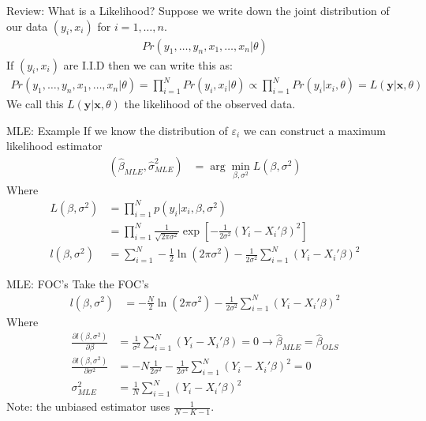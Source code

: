 \documentclass[aspectratio=169]{beamer}
\begin{document}
\begin{frame}{Review: What is a Likelihood?}
Suppose we write down the joint distribution of our data $(y_i,x_i)$ for $i=1,\ldots,n$.
\begin{align*}
Pr(y_1,\ldots,y_n, x_1,\ldots,x_n | \theta)
\end{align*}
If  $(y_i,x_i)$ are I.I.D then we can write this as:
\begin{align*}
 Pr(y_1,\ldots,y_n, x_1,\ldots,x_n | \theta) = \prod_{i=1}^N Pr(y_i, x_i | \theta) \propto \prod_{i=1}^N Pr(y_i | x_i , \theta)=L( \mathbf{y}| \mathbf{x} ,\theta )
\end{align*}
We call this $L( \mathbf{y}| \mathbf{x} ,\theta )$ the \alert{likelihood} of the observed data.
\end{frame}




\begin{frame}{MLE: Example}
If we know the distribution of $\varepsilon_i$ we can construct a \alert{maximum likelihood estimator}
\begin{align*}
(\widehat{\beta}_{MLE},\widehat{\sigma}^2_{MLE}) &= \arg \min_{\beta,\sigma^2} L(\beta,\sigma^2)
\end{align*}
Where 
\begin{align*} 
L(\beta,\sigma^2) &= \prod_{i=1}^N p(y_i | x_i,\beta,\sigma^2) \\
                  &= \prod_{i=1}^N \frac{1}{\sqrt{2 \pi \sigma^2}} \exp \left[-\frac{1}{2\sigma^2}(Y_i - X_i' \beta)^2 \right]\\
l(\beta,\sigma^2) &= \sum_{i=1}^N -\frac{1}{2} \ln (2 \pi \sigma^2) - \frac{1}{2 \sigma^2} \sum_{i=1}^N(Y_i - X_i' \beta)^2
\end{align*}
\end{frame}

\begin{frame}{MLE: FOC's}
Take the FOC's
\begin{align*}
l(\beta,\sigma^2) &= -\frac{N}{2} \ln (2 \pi \sigma^2) - \frac{1}{2 \sigma^2} \sum_{i=1}^N(Y_i - X_i' \beta)^2
\end{align*}
Where 
\begin{align*} 
\frac{ \partial l(\beta,\sigma^2) }{\partial \beta}&= \frac{1}{ \sigma^2}\sum_{i=1}^N(Y_i - X_i' \beta) = 0 \rightarrow \widehat{\beta}_{MLE}= \widehat{\beta}_{OLS}\\ 
\frac{ \partial l(\beta,\sigma^2) }{\partial \sigma^2}&= -N \frac{1}{2 \sigma^2}  -  \frac{1}{2 \sigma^4} \sum_{i=1}^N(Y_i - X_i' \beta)^2 = 0 \\
\sigma^2_{MLE} &= \frac{1}{N} \sum_{i=1}^N (Y_i - X_i' \beta)^2
\end{align*}
Note: the unbiased estimator uses $\frac{1}{N-K-1}$.
\end{frame}
\end{document}
